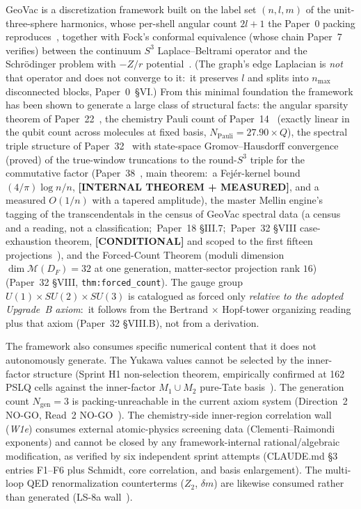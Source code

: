 \documentclass[11pt,a4paper]{article}
\theoremstyle{plain}
\theoremstyle{definition}
\newcommand{\Mcal}{\mathcal{M}}
\newcommand{\DF}{D_F}
\newcommand{\Ngen}{N_{\mathrm{gen}}}
\newcommand{\sphere}[1]{S^{#1}}
\begin{document}
GeoVac is a discretization framework built on the label set $(n,l,m)$ of the unit-three-sphere harmonics, whose per-shell angular count $2l+1$ the Paper~0 packing reproduces~\cite{paper0}, together with Fock's conformal equivalence (whose chain Paper~7 verifies) between the continuum $\sphere{3}$ Laplace--Beltrami operator and the Schr\"odinger problem with $-Z/r$ potential~\cite{paper7}.  (The graph's edge Laplacian is \emph{not} that operator and does not converge to it:\ it preserves $l$ and splits into $n_{\max}$ disconnected blocks, Paper~0~\S VI.) From this minimal foundation the framework has been shown to generate a large class of structural facts:  the angular sparsity theorem of Paper~22~\cite{paper22}, the chemistry Pauli count of Paper~14~\cite{paper14} (exactly linear in the qubit count across molecules at fixed basis, $N_{\mathrm{Pauli}} = 27.90 \times Q$), the spectral triple structure of Paper~32~\cite{paper32} with state-space Gromov--Hausdorff convergence (proved) of the true-window truncations to the round-$\sphere{3}$ triple for the commutative factor (Paper~38~\cite{paper38}, main theorem:\ a Fej\'er-kernel bound $(4/\pi)\log n/n$, \textbf{[INTERNAL THEOREM + MEASURED]}, and a measured $O(1/n)$ with a tapered amplitude), the master Mellin engine's tagging of the transcendentals in the census of GeoVac spectral data (a census and a reading, not a classification;\ Paper~18 \S III.7;\ Paper~32 \S VIII case-exhaustion theorem, \textbf{[CONDITIONAL]} and scoped to the first fifteen projections~\cite{paper18,paper32}), and the Forced-Count Theorem (moduli dimension $\dim \Mcal(\DF) = 32$ at one generation, matter-sector projection rank $16$) (Paper~32 \S VIII, \texttt{thm:forced\_count}).  The gauge group $U(1) \times SU(2) \times SU(3)$ is catalogued as forced only \emph{relative to the adopted Upgrade~B axiom}:\ it follows from the Bertrand $\times$ Hopf-tower organizing reading plus that axiom (Paper~32 \S VIII.B), not from a derivation.

The framework also consumes specific numerical content that it does not autonomously generate. The Yukawa values cannot be selected by the inner-factor structure (Sprint H1 non-selection theorem, empirically confirmed at 162 PSLQ cells against the inner-factor $M_1 \cup M_2$ pure-Tate basis~\cite{paper32,debug_yukawa_pslq}). The generation count $\Ngen = 3$ is packing-unreachable in the current axiom system (Direction~2 NO-GO, Read~2 NO-GO~\cite{debug_read2}). The chemistry-side inner-region correlation wall (\emph{W1e}) consumes external atomic-physics screening data (Clementi--Raimondi exponents) and cannot be closed by any framework-internal rational/algebraic modification, as verified by six independent sprint attempts (CLAUDE.md \S 3 entries F1--F6 plus Schmidt, core correlation, and basis enlargement). The multi-loop QED renormalization counterterms ($Z_2$, $\delta m$) are likewise consumed rather than generated (LS-8a wall~\cite{paper36}).
\end{document}
